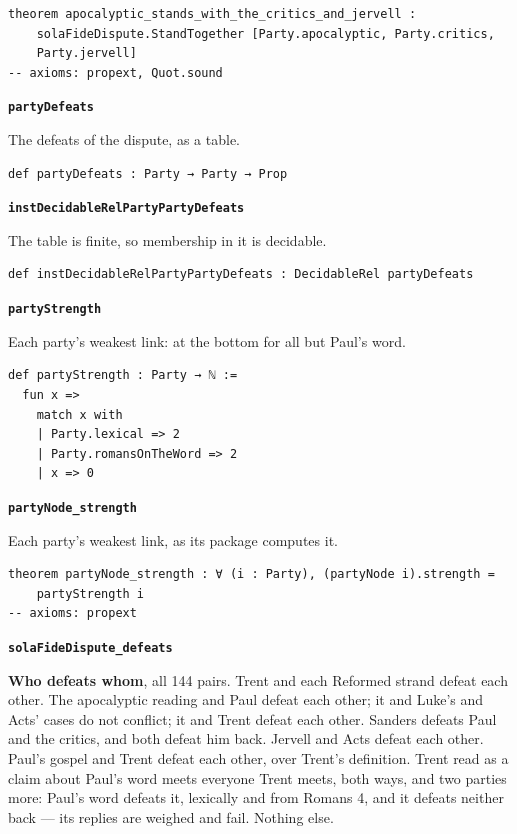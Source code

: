 \documentclass[11pt]{article}
\begin{document}
{\small\begin{verbatim}
theorem apocalyptic_stands_with_the_critics_and_jervell :
    solaFideDispute.StandTogether [Party.apocalyptic, Party.critics,
    Party.jervell]
-- axioms: propext, Quot.sound
\end{verbatim}}
\par\medskip\noindent\textbf{\texttt{party\allowbreak{}Defeats}}\par\nobreak\noindent
The defeats of the dispute, as a table.

{\small\begin{verbatim}
def partyDefeats : Party → Party → Prop
\end{verbatim}}
\par\medskip\noindent\textbf{\texttt{inst\allowbreak{}Decidable\allowbreak{}Rel\allowbreak{}Party\allowbreak{}Party\allowbreak{}Defeats}}\par\nobreak\noindent
The table is finite, so membership in it is decidable.

{\small\begin{verbatim}
def instDecidableRelPartyPartyDefeats : DecidableRel partyDefeats
\end{verbatim}}
\par\medskip\noindent\textbf{\texttt{party\allowbreak{}Strength}}\par\nobreak\noindent
Each party's weakest link: at the bottom for all but Paul's word.

{\small\begin{verbatim}
def partyStrength : Party → ℕ :=
  fun x =>
    match x with
    | Party.lexical => 2
    | Party.romansOnTheWord => 2
    | x => 0
\end{verbatim}}
\par\medskip\noindent\textbf{\texttt{party\allowbreak{}Node\_\allowbreak{}strength}}\par\nobreak\noindent
Each party's weakest link, as its package computes it.

{\small\begin{verbatim}
theorem partyNode_strength : ∀ (i : Party), (partyNode i).strength =
    partyStrength i
-- axioms: propext
\end{verbatim}}
\par\medskip\noindent\textbf{\texttt{sola\allowbreak{}Fide\allowbreak{}Dispute\_\allowbreak{}defeats}}\par\nobreak\noindent
\textbf{Who defeats whom}, all 144 pairs. Trent and each Reformed strand defeat each other. The apocalyptic reading and Paul defeat each other; it and Luke's and Acts' cases do not conflict; it and Trent defeat each other. Sanders defeats Paul and the critics, and both defeat him back. Jervell and Acts defeat each other. Paul's gospel and Trent defeat each other, over Trent's definition. Trent read as a claim about Paul's word meets everyone Trent meets, both ways, and two parties more: Paul's word defeats it, lexically and from Romans 4, and it defeats neither back — its replies are weighed and fail. Nothing else.
\end{document}
